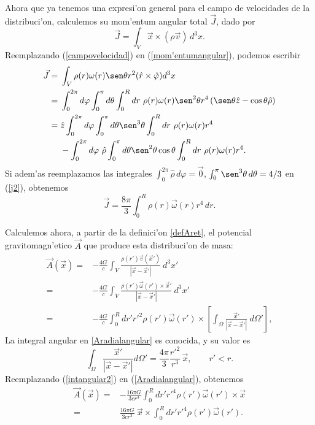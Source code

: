 Ahora que ya tenemos una expresi'on general para el campo de velocidades de la distribuci'on, calculemos su mom'entum angular total $\vec{J}$, dado por
\begin{equation}
\vec{J}=\int_V \vec{x}\times(\rho \vec{v})\,d^3x.\label{mom'entumangular}
\end{equation}
Reemplazando (\ref{campovelocidad}) en (\ref{mom'entumangular}), podemos escribir
\begin{align}
\vec{J}={}&\int_V \rho (r)\omega(r)\sen \theta r^2(\hat{r}\times\hat{\varphi })d^3x\\
 ={}&\int_0^{2\pi}d\varphi \int_0^{\pi}d\theta \int_0^{R}dr\ \rho (r)\omega(r)\sen^2 \theta r^4\left(\sen \theta \hat{z}-\cos \theta \hat{\rho}\right)\\
 ={}&\hat{z}\int_0^{2\pi}d\varphi \int_0^{\pi}d\theta \sen^3 \theta  \int_0^{R}dr\ \rho (r)\omega(r)r^4\nonumber\\
 {}&-\int_0^{2\pi}d\varphi \ \hat{\rho}\int_0^{\pi}d\theta \sen^2 \theta \cos \theta  \int_0^{R}dr\ \rho (r)\omega(r)r^4.\label{j2}
\end{align}
Si adem'as reemplazamos las integrales $\int_0^{2\pi}\hat{\rho}\,d\varphi =\vec{0}$, $\int_0^{\pi}\sen^3\theta\,d\theta  ={4}/{3}$ en (\ref{j2}), obtenemos
\begin{equation}\boxed{
\vec{J}=\frac{8\pi}{3}\int_0^{R}\rho (r)\vec{\omega}(r)r^4\, dr.}\label{jgeneral}
\end{equation}

Calculemos ahora, a partir de la definici'on \eqref{defAret}, el potencial gravitomagn'etico $\vec{A}$ que produce esta distribuci'on de masa:
\begin{align}
\vec{A}(\vec{x})={}&-\frac{4G}{c}\int_V \frac{\rho (r') \vec{v}(\vec{x}')}{|\vec{x}-\vec{x}'|}\ d^3x'\\
 ={}&-\frac{4G}{c}\int_V \frac{\rho (r') \vec{\omega}(r')\times\vec{x}'}{|\vec{x}-\vec{x}'|}\ d^3x'\\
 ={}&-\frac{4G}{c}\int_0^{R}dr'r'^2\rho (r')\vec{\omega}(r')\times\left[\int_{\Omega}\frac{\vec{x}'}{|\vec{x}-\vec{x}'|}\ d\Omega'\right],\label{Aradialangular}
\end{align}
La integral angular en \eqref{Aradialangular} es conocida, y su valor es
\begin{equation}
\int_{\Omega}\frac{\vec{x}'}{|\vec{x}-\vec{x}'|}d\Omega'=
\dfrac{4\pi}{3}\frac{r'^2}{r^3}\, \vec{x}, \qquad r'<r .\label{intangular2}
\end{equation}
Reemplazando (\ref{intangular2}) en (\ref{Aradialangular}), obtenemos
\begin{align}
\vec{A}(\vec{x})={}&-\frac{16\pi G}{3cr^3}\int_0^{R}dr'r'^4\rho (r')\vec{\omega}(r')\times\vec{x}\\
={}&\frac{16\pi G}{3cr^3}\ \vec{x}\times\int_0^{R}dr'r'^4\rho (r')\vec{\omega}(r').\label{Acasi}
\end{align}

